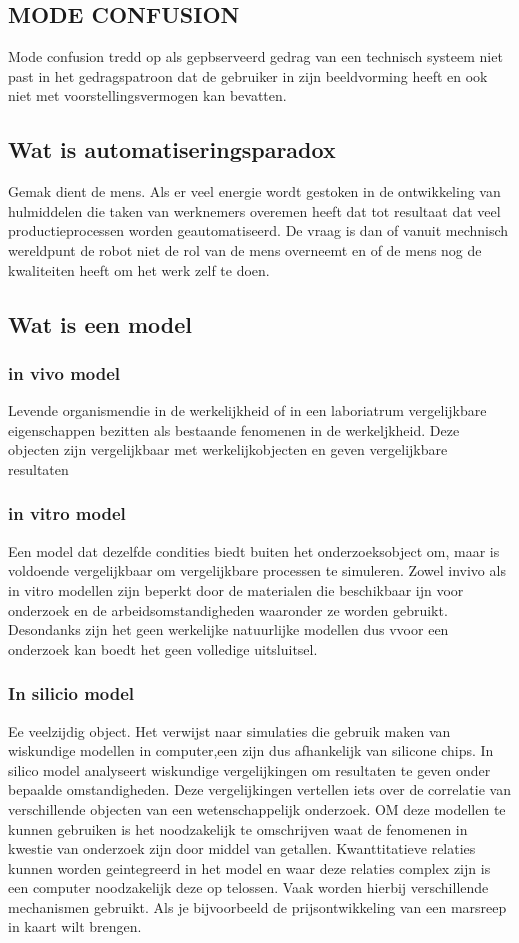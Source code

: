 \subsection{MODE CONFUSION }
Mode confusion tredd op als gepbserveerd gedrag van een technisch systeem niet past in het gedragspatroon dat de gebruiker in zijn beeldvorming heeft  en ook niet met voorstellingsvermogen kan bevatten.
\subsection{Wat is automatiseringsparadox}
Gemak dient de mens. Als er veel energie wordt gestoken in de ontwikkeling van hulmiddelen die taken van werknemers overemen heeft dat tot resultaat dat veel productieprocessen worden geautomatiseerd. De vraag is dan of vanuit mechnisch wereldpunt de robot niet de rol van de mens overneemt en of de mens nog de kwaliteiten heeft om het werk zelf te doen.
\cite{bicker21102016automatiseringsparadox }
\cite{vseautoparadox }
\cite{blogxot21112016slimapparaat }


\subsection{Wat is een model}

\subsubsection{in vivo model}
Levende organismendie in de werkelijkheid of in een laboriatrum vergelijkbare eigenschappen bezitten als bestaande fenomenen in de werkeljkheid. Deze objecten zijn vergelijkbaar met werkelijkobjecten en geven vergelijkbare resultaten
\subsubsection{in vitro model}
Een model dat dezelfde condities biedt  buiten het onderzoeksobject om, maar is voldoende vergelijkbaar om vergelijkbare processen te simuleren.
Zowel invivo als in vitro modellen zijn beperkt door de materialen die beschikbaar ijn voor onderzoek en de arbeidsomstandigheden waaronder ze worden gebruikt. Desondanks zijn het geen werkelijke natuurlijke modellen dus vvoor een onderzoek kan boedt het geen volledige uitsluitsel.
\subsubsection{In silicio model}
Ee veelzijdig object. Het verwijst naar simulaties die gebruik maken van wiskundige modellen in computer,een zijn dus afhankelijk van silicone chips. In silico model analyseert  wiskundige vergelijkingen om resultaten te geven onder bepaalde omstandigheden. Deze vergelijkingen vertellen iets over de correlatie van verschillende objecten van een wetenschappelijk onderzoek. OM deze modellen te kunnen gebruiken is het noodzakelijk te omschrijven waat de fenomenen in kwestie van onderzoek zijn door middel van getallen. Kwanttitatieve relaties kunnen worden geintegreerd in het model en waar deze relaties complex zijn is een computer noodzakelijk deze op telossen. Vaak worden hierbij verschillende mechanismen gebruikt. Als je bijvoorbeeld de prijsontwikkeling van een marsreep in kaart wilt brengen.
